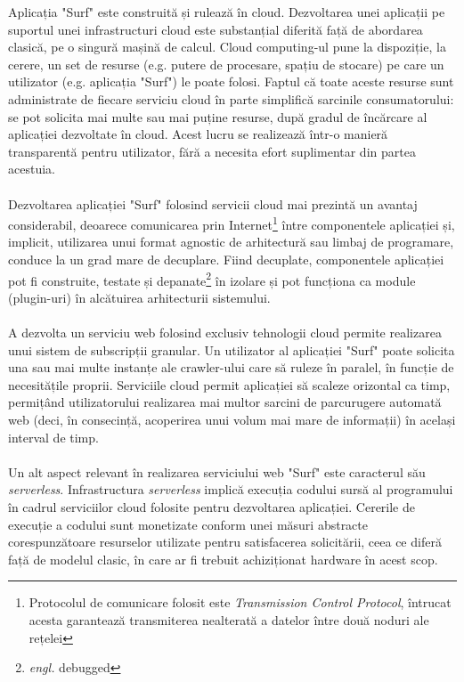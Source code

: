 Aplicația "Surf" este construită și rulează în cloud. Dezvoltarea unei aplicații pe suportul unei infrastructuri cloud este substanțial diferită față de abordarea clasică, pe o singură mașină de calcul. Cloud computing-ul pune la dispoziție, la cerere, un set de resurse (e.g. putere de procesare, spațiu de stocare) pe care un utilizator (e.g. aplicația "Surf") le poate folosi. Faptul că toate aceste resurse sunt administrate de fiecare serviciu cloud în parte simplifică sarcinile consumatorului: se pot solicita mai multe sau mai puține resurse, după gradul de încărcare al aplicației dezvoltate în cloud. Acest lucru se realizează într-o manieră transparentă pentru utilizator, fără a necesita efort suplimentar din partea acestuia.
\\
\\
Dezvoltarea aplicației "Surf" folosind servicii cloud mai prezintă un avantaj considerabil, deoarece comunicarea prin Internet\footnote{Protocolul de comunicare folosit este \textit{Transmission Control Protocol}\cite{tcp}, întrucat acesta garantează transmiterea nealterată a datelor între două noduri ale rețelei} între componentele aplicației și, implicit, utilizarea unui format agnostic de arhitectură sau limbaj de programare, conduce la un grad mare de decuplare. Fiind decuplate, componentele aplicației pot fi construite, testate și depanate\footnote{\emph{engl.} debugged} în izolare și pot funcționa ca module (plugin-uri) în alcătuirea arhitecturii sistemului.
\\
\\
A dezvolta un serviciu web folosind exclusiv tehnologii cloud permite realizarea unui sistem de subscripții granular. Un utilizator al aplicației "Surf" poate solicita una sau mai multe instanțe ale crawler-ului care să ruleze în paralel, în funcție de necesitățile proprii. Serviciile cloud permit aplicației să scaleze orizontal ca timp, permițând utilizatorului realizarea mai multor sarcini de parcurugere automată web (deci, în consecință, acoperirea unui volum mai mare de informații) în același interval de timp.
\\
\\
Un alt aspect relevant în realizarea serviciului web "Surf" este caracterul său \emph{serverless}. Infrastructura \emph{serverless} implică execuția codului sursă al programului în cadrul serviciilor cloud folosite pentru dezvoltarea aplicației. Cererile de execuție a codului sunt monetizate conform unei măsuri abstracte corespunzătoare resurselor utilizate pentru satisfacerea solicitării, ceea ce diferă față de modelul clasic, în care ar fi trebuit achiziționat hardware în acest scop\cite{serverless-characterization}.
